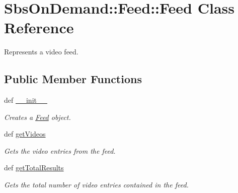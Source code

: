 \hypertarget{class_sbs_on_demand_1_1_feed_1_1_feed}{
\section{\-Sbs\-On\-Demand\-:\-:\-Feed\-:\-:\-Feed \-Class \-Reference}
\label{class_sbs_on_demand_1_1_feed_1_1_feed}
}


\-Represents a video feed.  


\subsection*{\-Public \-Member \-Functions}
\begin{DoxyCompactItemize}
\item 
def \hyperlink{class_sbs_on_demand_1_1_feed_1_1_feed_afe94613e3466fd8d015146301de3e52d}{\-\_\-\-\_\-init\-\_\-\-\_\-}
\begin{DoxyCompactList}\small\item\em \-Creates a \hyperlink{class_sbs_on_demand_1_1_feed_1_1_feed}{\-Feed} object. \end{DoxyCompactList}\item 
def \hyperlink{class_sbs_on_demand_1_1_feed_1_1_feed_ae869544f2df4ca0c65693871554ef328}{get\-Videos}
\begin{DoxyCompactList}\small\item\em \-Gets the video entries from the feed. \end{DoxyCompactList}\item 
def \hyperlink{class_sbs_on_demand_1_1_feed_1_1_feed_aedbf03d55460defe81bcab779d91e701}{get\-Total\-Results}
\begin{DoxyCompactList}\small\item\em \-Gets the total number of video entries contained in the feed. \end{DoxyCompactList}\end{DoxyCompactItemize}
